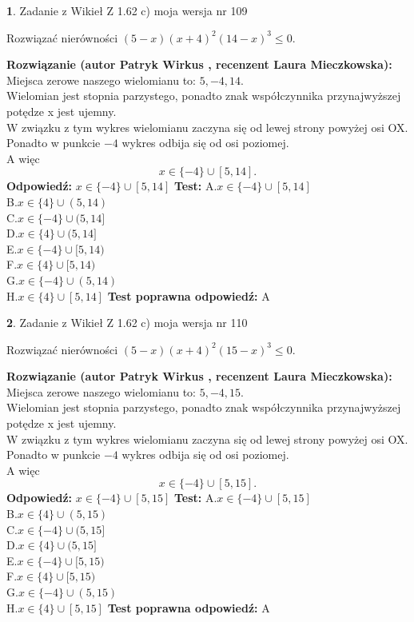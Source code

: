 \documentclass[12pt, a4paper]{article}
\theoremstyle{definition} %
\newtheorem{zad}{}
\newcommand{\zadStart}[1]{\begin{zad}#1\newline}
\newcommand{\zadStop}{\end{zad}}
\newcommand{\rozwStart}[2]{\noindent \textbf{Rozwiązanie (autor #1 , recenzent #2): }\newline}
\newcommand{\rozwStop}{\newline}
\newcommand{\odpStart}{\noindent \textbf{Odpowiedź:}\newline}
\newcommand{\odpStop}{\newline}
\newcommand{\testStart}{\noindent \textbf{Test:}\newline}
\newcommand{\testStop}{\newline}
\newcommand{\kluczStart}{\noindent \textbf{Test poprawna odpowiedź:}\newline}
\newcommand{\kluczStop}{\newline}
\begin{document}
\zadStart{Zadanie z Wikieł Z 1.62 c) moja wersja nr 109}

Rozwiązać nierówności $(5-x)(x+4)^{2}(14-x)^{3}\le0$.
\zadStop
\rozwStart{Patryk Wirkus}{Laura Mieczkowska}
Miejsca zerowe naszego wielomianu to: $5, -4, 14$.\\
Wielomian jest stopnia parzystego, ponadto znak współczynnika przy\linebreak najwyższej potędze x jest ujemny.\\ W związku z tym wykres wielomianu zaczyna się od lewej strony powyżej osi OX.\\
Ponadto w punkcie $-4$ wykres odbija się od osi poziomej.\\
A więc $$x \in \{-4\} \cup [5,14].$$
\rozwStop
\odpStart
$x \in \{-4\} \cup [5,14]$
\odpStop
\testStart
A.$x \in \{-4\} \cup [5,14]$\\
B.$x \in \{4\} \cup (5,14)$\\
C.$x \in \{-4\} \cup (5,14]$\\
D.$x \in \{4\} \cup (5,14]$\\
E.$x \in \{-4\} \cup [5,14)$\\
F.$x \in \{4\} \cup [5,14)$\\
G.$x \in \{-4\} \cup (5,14)$\\
H.$x \in \{4\} \cup [5,14]$
\testStop
\kluczStart
A
\kluczStop



\zadStart{Zadanie z Wikieł Z 1.62 c) moja wersja nr 110}

Rozwiązać nierówności $(5-x)(x+4)^{2}(15-x)^{3}\le0$.
\zadStop
\rozwStart{Patryk Wirkus}{Laura Mieczkowska}
Miejsca zerowe naszego wielomianu to: $5, -4, 15$.\\
Wielomian jest stopnia parzystego, ponadto znak współczynnika przy\linebreak najwyższej potędze x jest ujemny.\\ W związku z tym wykres wielomianu zaczyna się od lewej strony powyżej osi OX.\\
Ponadto w punkcie $-4$ wykres odbija się od osi poziomej.\\
A więc $$x \in \{-4\} \cup [5,15].$$
\rozwStop
\odpStart
$x \in \{-4\} \cup [5,15]$
\odpStop
\testStart
A.$x \in \{-4\} \cup [5,15]$\\
B.$x \in \{4\} \cup (5,15)$\\
C.$x \in \{-4\} \cup (5,15]$\\
D.$x \in \{4\} \cup (5,15]$\\
E.$x \in \{-4\} \cup [5,15)$\\
F.$x \in \{4\} \cup [5,15)$\\
G.$x \in \{-4\} \cup (5,15)$\\
H.$x \in \{4\} \cup [5,15]$
\testStop
\kluczStart
A
\kluczStop
\end{document}

